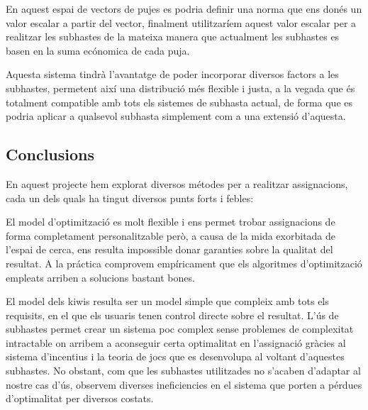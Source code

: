 \documentclass[10pt,twocolumn]{article}
\begin{document}
En aquest espai de vectors de pujes es podria definir una norma que ens donés un valor escalar a partir del vector, finalment utilitzaríem aquest valor escalar per a realitzar les subhastes de la mateixa manera que actualment les subhastes es basen en la suma ecónomica de cada puja.

Aquesta sistema tindrà l'avantatge de poder incorporar diversos factors a les subhastes, permetent així una distribució més flexible i justa, a la vegada que és totalment compatible amb tots els sistemes de subhasta actual, de forma que es podria aplicar a qualsevol subhasta simplement com a una extensió d'aquesta.



\newpage															
\begin{tcolorbox}[colframe=white,colback=redviolet!20,sharp corners=all,size=minimal,halign=center,valign=center]
	\section{Conclusions}
\end{tcolorbox}
	En aquest projecte hem explorat diversos métodes per a realitzar assignacions, cada un dels quals ha tingut diversos punts forts i febles:
	
	El model d'optimització es molt flexible i ens permet trobar assignacions de forma completament personalitzable però, a causa de la mida exorbitada de l'espai de cerca, ens resulta impossible donar garanties sobre la qualitat del resultat. A la práctica comprovem empíricament que els algoritmes d'optimització empleats arriben a solucions bastant bones.
	
	El model dels kiwis resulta ser un model simple que compleix amb tots els requisits, en el que els usuaris tenen control directe sobre el resultat. L'ús de subhastes permet crear un sistema poc complex sense problemes de complexitat intractable on arribem a aconseguir certa optimalitat en l'assignació gràcies al sistema d'incentius i la teoria de jocs que es desenvolupa al voltant d'aquestes subhastes. No obstant, com que les subhastes utilitzades no s'acaben d'adaptar al nostre cas d'ús, observem diverses ineficiencies en el sistema que porten a pérdues d'optimalitat per diversos costats.
	
\end{document}
